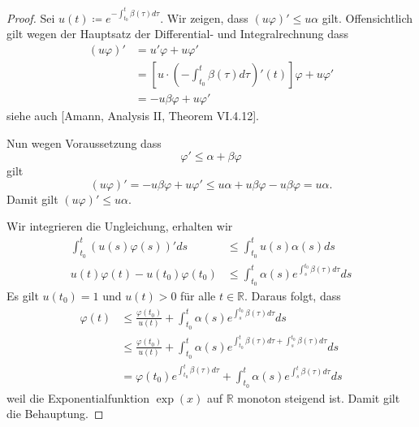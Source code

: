 \documentclass[draft,a5paper]{article}
\theoremstyle{remark}
\begin{document}
\begin{proof}
  Sei \(u(t) \coloneq e^{-\int_{t_{0}}^{t}\beta(\tau)d\tau}\).  Wir zeigen, dass \((u\varphi)' \le
  u\alpha\) gilt.  Offensichtlich gilt wegen der Hauptsatz der
  Differential- und Integralrechnung dass
  \begin{align*}
    (u\varphi)' &= u' \varphi + u \varphi' \\
    &= [ u \cdot \left(-\int_{t_{0}}^{t}\beta(\tau)d\tau\right)'(t) ] \varphi + u
      \varphi' \\
    &= - u \beta \varphi + u \varphi'
  \end{align*}
  siehe auch [Amann, Analysis II, Theorem VI.4.12].

  Nun wegen Voraussetzung dass
  \[\varphi' \le \alpha + \beta \varphi\]
  gilt
  \[(u \varphi)' = - u \beta \varphi + u \varphi' \le u \alpha + u \beta \varphi - u \beta \varphi = u \alpha.\] Damit gilt
  \((u\varphi)' \le u \alpha\).

  Wir integrieren die Ungleichung, erhalten wir
  \begin{align*}
    \int_{t_{0}}^{t}{(u(s) \varphi(s))' ds} &\le \int_{t_{0}}^{t}{u(s) \alpha(s) ds} \\
    u(t)\varphi(t) - u(t_{0})\varphi(t_{0}) &\le \int_{t_{0}}^{t}{\alpha(s)
                                  e^{\int_{s}^{t_{0}}\beta(\tau)d\tau} ds}
  \end{align*}
  Es gilt \(u(t_{0}) = 1\) und \(u(t) > 0\) für alle
  \(t \in \mathbb{R}\).  Daraus folgt, dass
  \begin{align*}
    \varphi(t) &\le \frac{\varphi(t_{0})}{u(t)} + \int_{t_{0}}^{t}{\alpha(s)
           e^{\int_{s}^{t_{0}}\beta(\tau)d\tau} ds} \\
           &\le \frac{\varphi(t_{0})}{u(t)} + \int_{t_{0}}^{t}{\alpha(s)
             e^{\int_{t_{0}}^{t}\beta(\tau)d\tau + \int_{s}^{t_{0}}\beta(\tau)d\tau} ds} \\
         &= \varphi(t_{0})e^{\int_{t_{0}}^{t}\beta(\tau)d\tau}+\int_{t_{0}}^{t}\alpha(s)e^{\int_{s}^{t}\beta(\tau)d\tau}ds
  \end{align*}
  weil die Exponentialfunktion \(\exp(x)\) auf \(\mathbb{R}\) monoton steigend ist.
  Damit gilt die Behauptung.
\end{proof}
\end{document}

